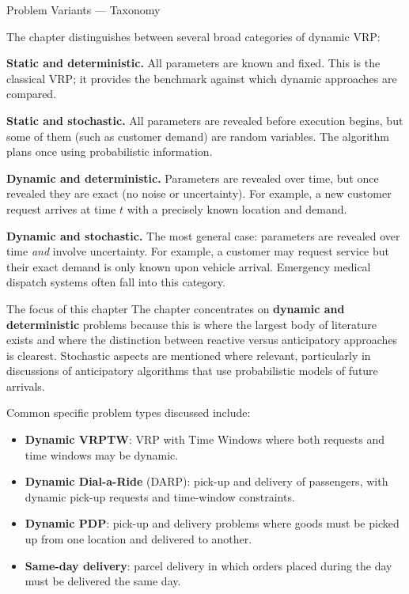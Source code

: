 \documentclass[aspectratio=169,10pt]{beamer}
\begin{document}
\begin{frame}[allowframebreaks]{Problem Variants — Taxonomy}

  The chapter distinguishes between several broad categories of dynamic VRP:

  \medskip
  \textbf{Static and deterministic.}  All parameters are known and fixed.
  This is the classical VRP; it provides the benchmark against which dynamic
  approaches are compared.

  \medskip
  \textbf{Static and stochastic.}  All parameters are revealed before execution
  begins, but some of them (such as customer demand) are random variables.
  The algorithm plans once using probabilistic information.

  \medskip
  \textbf{Dynamic and deterministic.}  Parameters are revealed over time, but
  once revealed they are exact (no noise or uncertainty).  For example, a new
  customer request arrives at time $t$ with a precisely known location and demand.

  \medskip
  \textbf{Dynamic and stochastic.}  The most general case: parameters are revealed
  over time \emph{and} involve uncertainty.  For example, a customer may request
  service but their exact demand is only known upon vehicle arrival.  Emergency
  medical dispatch systems often fall into this category.

  \framebreak

  \begin{block}{The focus of this chapter}
    The chapter concentrates on \textbf{dynamic and deterministic} problems
    because this is where the largest body of literature exists and where the
    distinction between reactive versus anticipatory approaches is clearest.
    Stochastic aspects are mentioned where relevant, particularly in discussions
    of anticipatory algorithms that use probabilistic models of future arrivals.
  \end{block}

  \medskip
  Common specific problem types discussed include:
  \begin{itemize}
    \item \textbf{Dynamic VRPTW}: VRP with Time Windows where both requests
          and time windows may be dynamic.
    \item \textbf{Dynamic Dial-a-Ride} (DARP): pick-up and delivery of passengers,
          with dynamic pick-up requests and time-window constraints.
    \item \textbf{Dynamic PDP}: pick-up and delivery problems where goods must
          be picked up from one location and delivered to another.
    \item \textbf{Same-day delivery}: parcel delivery in which orders placed
          during the day must be delivered the same day.
  \end{itemize}


\end{frame}
\end{document}
